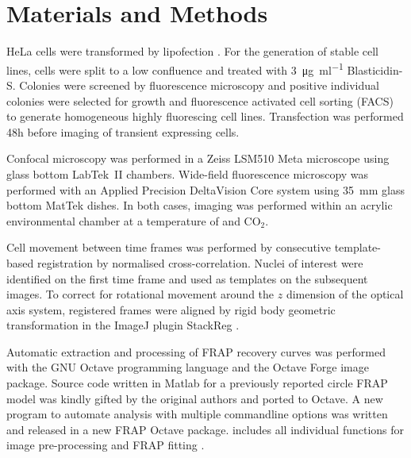 \section{Materials and Methods}

  HeLa cells were transformed by lipofection .
  For the generation of stable cell lines,
  cells were split to a low confluence and treated
  with \SI{3}{\ug\per\ml} Blasticidin-S.
  Colonies were screened by fluorescence microscopy
  and positive individual colonies were selected for growth
  and fluorescence activated cell sorting (FACS) to generate
  homogeneous highly fluorescing cell lines.
  Transfection was performed 48h before imaging of
  transient expressing cells.

  Confocal microscopy was performed in a Zeiss LSM510 Meta microscope
  using glass bottom LabTek~II chambers.  Wide-field fluorescence
  microscopy was performed with an Applied Precision DeltaVision Core
  system using \SI{35}{\mm} glass bottom MatTek dishes.  In both
  cases, imaging was performed within an acrylic environmental chamber
  at a temperature of  and  CO$_2$.


  Cell movement between time frames was performed by consecutive
  template-based registration by normalised cross-correlation.
  Nuclei of interest were identified on the first time frame
  and used as templates on the subsequent images.
  To correct for rotational movement
  around the $z$ dimension of the optical axis system,
  registered frames were aligned by rigid body geometric transformation
  in the ImageJ \citep{imagej1} plugin StackReg \citep{stackreg}.

  Automatic extraction and processing of FRAP recovery curves was
  performed with the GNU Octave programming language \citep{octave}
  and the Octave Forge image package.  Source code written in Matlab
  for a previously reported circle FRAP model \citep{mcnally-frap-code}
  was kindly gifted by the original authors and ported to Octave.
  A new program to automate analysis with multiple commandline options
  was written and released in a new FRAP Octave package.
   includes all individual functions for image
  pre-processing and FRAP fitting .
